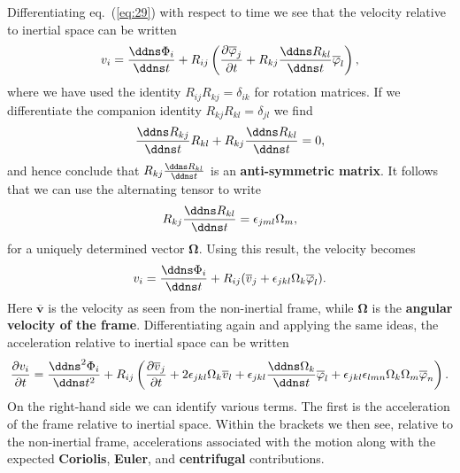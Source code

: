  Differentiating eq.~(\ref{eq:29}) with respect to time 
we see that the velocity relative to inertial space can be written
\begin{equation}
v_{i}=\frac{\ddns \Phi_{i}}{\ddns t}+R_{ij}\left(\frac{\partial\overline{\varphi}_{j}}{\partial t}+R_{kj}\frac{\ddns R_{kl}}{\ddns t}\overline{\varphi}_{l}\right),
\label{eq:30}
\end{equation}
where we have used the identity $R_{ij}R_{kj}=\delta_{ik}$ for rotation matrices. If we differentiate the
companion identity $R_{kj}R_{kl}=\delta_{jl}$ we find
\begin{equation}
\frac{\ddns R_{kj}}{\ddns t}R_{kl}+R_{kj}\frac{\ddns R_{kl}}{\ddns t}=0,
\label{eq:31}
\end{equation}
and hence conclude that $R_{kj}\frac{\ddns R_{kl}}{\ddns t}$ is an \textbf{anti-symmetric matrix}. It follows that we can use the 
alternating tensor to write
\begin{equation}
R_{kj}\frac{\ddns R_{kl}}{\ddns t}=\epsilon_{jml}\Omega_{m},
\label{eq:32}
\end{equation}
for a uniquely determined vector $\bm{\Omega}$. Using this result, the velocity becomes
\begin{equation}
v_{i}=\frac{\ddns \Phi_{i}}{\ddns t}+R_{ij}(\overline{v}_{j}+\epsilon_{jkl}\Omega_{k}\overline{\varphi}_{l}).
\label{eq:33}
\end{equation}
Here $\overline{\mathbf{v}}$ is the velocity as seen from the non-inertial frame, while $\bm{\Omega}$ is the 
\textbf{angular velocity of the frame}. Differentiating again and applying the same ideas, the acceleration relative 
to inertial space can be written
\begin{equation}
\frac{\partial v_{i}}{\partial t}=\frac{\ddns ^{2}\Phi_{i}}{\ddns t^{2}}+R_{ij}\left(\frac{\partial\overline{v}_{j}}{\partial t}+2\epsilon_{jkl}\Omega_{k}\overline{v}_{l}+\epsilon_{jkl}\frac{\ddns \Omega_{k}}{\ddns t}\overline{\varphi}_{l}+\epsilon_{jkl}\epsilon_{lmn}\Omega_{k}\Omega_{m}\overline{\varphi}_{n}\right).
\label{eq:34}
\end{equation}
On the right-hand side we can identify various terms. The first is the acceleration of the frame relative to 
inertial space. Within the brackets we then see, relative to the non-inertial frame, accelerations associated 
with the motion along with the expected \textbf{Coriolis}, \textbf{Euler}, and \textbf{centrifugal} contributions.

